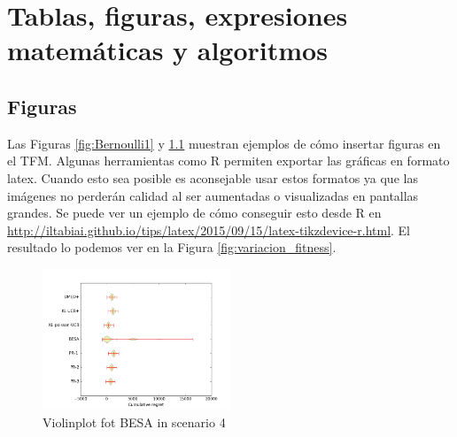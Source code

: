 \chapter{Tablas, figuras, expresiones matemáticas y algoritmos}

\section{Figuras}

Las Figuras \ref{fig:Bernoulli1} y \ref{fig:violin_besa_escenario4} muestran ejemplos de cómo insertar figuras en el TFM. Algunas herramientas como R permiten exportar las gráficas en formato latex. Cuando esto sea posible es aconsejable usar estos formatos ya que las imágenes no perderán calidad al ser aumentadas o visualizadas en pantallas grandes. Se puede ver un ejemplo de cómo conseguir esto desde R en \url{http://iltabiai.github.io/tips/latex/2015/09/15/latex-tikzdevice-r.html}. El resultado lo podemos ver en la Figura \ref{fig:variacion_fitness}.

\begin{figure}[!htb]
	\centering
	\includegraphics[width=0.5\textwidth]{recursos/Figure2}
	\caption{Violinplot fot BESA in scenario 4}
	\label{fig:violin_besa_escenario4}
\end{figure}

